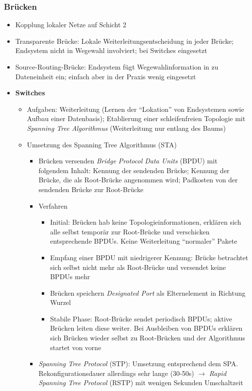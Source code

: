 \subsubsection{Brücken}
\begin{itemize}
	\item Kopplung lokaler Netze auf Schicht 2
	\item Transparente Brücke: Lokale Weiterleitungsentscheidung in jeder Brücke; Endsystem nicht in Wegewahl involviert; bei Switches eingesetzt
	\item Source-Routing-Brücke: Endsystem fügt Wegewahlinformation in zu Dateneinheit ein; einfach aber in der Praxis wenig eingesetzt
	\item \textbf{Switches}
	\begin{itemize}
		\item Aufgaben: Weiterleitung (Lernen der "`Lokation"' von Endsystemen sowie Aufbau einer Datenbasis); Etablierung einer schleifenfreien Topologie mit \textit{Spanning Tree Algorithmus} (Weiterleitung nur entlang des Baums)
		\item Umsetzung des Spanning Tree Algorithmus (STA)
		\begin{itemize}
			\item Brücken versenden \textit{Bridge Protocol Data Units} (BPDU) mit folgendem Inhalt: Kennung der sendenden Brücke; Kennung der Brücke, die als Root-Brücke angenommen wird; Padkosten von der sendenden Brücke zur Root-Brücke
			\item Verfahren
			\begin{itemize}
				\item Initial: Brücken hab keine Topologieinformationen, erklären sich alle selbst temporär zur Root-Brücke und verschicken entsprechende BPDUs. Keine Weiterleitung "`normaler"' Pakete
				\item Empfang einer BPDU mit niedrigerer Kennung: Brücke betrachtet sich selbst nicht mehr als Root-Brücke und versendet keine BPDUs mehr
				\item Brücken speichern \textit{Designated Port} als Elternelement in Richtung Wurzel
				\item Stabile Phase: Root-Brücke sendet periodisch BPDUs; aktive Brücken leiten diese weiter. Bei Ausbleiben von BPDUs erklären sich Brücken wieder selbst zu Root-Brücken und der Algorithmus startet von vorne
			\end{itemize}
			\item \textit{Spanning Tree Protocol} (STP): Umsetzung entsprechend dem SPA. Rekonfigurationsdauer allerdings sehr lange (30-50s) \(\rightarrow\) \textit{Rapid Spanning Tree Protocol} (RSTP) mit wenigen Sekunden Umschaltzeit

\end{itemize}
\end{itemize}
\end{itemize}

